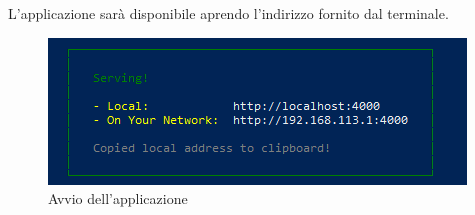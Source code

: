 L'applicazione sarà disponibile aprendo l'indirizzo fornito dal terminale.

\begin{figure}[H]
		\includegraphics[scale=1]{Images/install.png}
		\centering
		\caption{Avvio dell'applicazione}
\end{figure}
